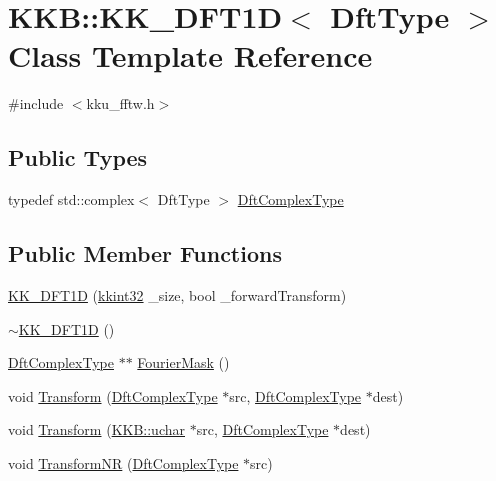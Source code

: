 \hypertarget{class_k_k_b_1_1_k_k___d_f_t1_d}{}\section{K\+KB\+:\+:K\+K\+\_\+\+D\+F\+T1D$<$ Dft\+Type $>$ Class Template Reference}
\label{class_k_k_b_1_1_k_k___d_f_t1_d}


{\ttfamily \#include $<$kku\+\_\+fftw.\+h$>$}

\subsection*{Public Types}
\begin{DoxyCompactItemize}
\item 
typedef std\+::complex$<$ Dft\+Type $>$ \hyperlink{class_k_k_b_1_1_k_k___d_f_t1_d_a4cbc827157dd30ddec2d3753e552a827}{Dft\+Complex\+Type}
\end{DoxyCompactItemize}
\subsection*{Public Member Functions}
\begin{DoxyCompactItemize}
\item 
\hyperlink{class_k_k_b_1_1_k_k___d_f_t1_d_ac65a8ecdf2e6ca0dcd032bcd0432993e}{K\+K\+\_\+\+D\+F\+T1D} (\hyperlink{namespace_k_k_b_a8fa4952cc84fda1de4bec1fbdd8d5b1b}{kkint32} \+\_\+size, bool \+\_\+forward\+Transform)
\item 
\hyperlink{class_k_k_b_1_1_k_k___d_f_t1_d_a30bc503da8f05cc35efebac47cb7b768}{$\sim$\+K\+K\+\_\+\+D\+F\+T1D} ()
\item 
\hyperlink{class_k_k_b_1_1_k_k___d_f_t1_d_a4cbc827157dd30ddec2d3753e552a827}{Dft\+Complex\+Type} $\ast$$\ast$ \hyperlink{class_k_k_b_1_1_k_k___d_f_t1_d_a15e9f465d09d12bdc83815b741d802ce}{Fourier\+Mask} ()
\item 
void \hyperlink{class_k_k_b_1_1_k_k___d_f_t1_d_a97bb58639bdc8f8bf1c11bda9bbd9d3d}{Transform} (\hyperlink{class_k_k_b_1_1_k_k___d_f_t1_d_a4cbc827157dd30ddec2d3753e552a827}{Dft\+Complex\+Type} $\ast$src, \hyperlink{class_k_k_b_1_1_k_k___d_f_t1_d_a4cbc827157dd30ddec2d3753e552a827}{Dft\+Complex\+Type} $\ast$dest)
\item 
void \hyperlink{class_k_k_b_1_1_k_k___d_f_t1_d_aea6d631eb5646ce70e3f2708783a6dfe}{Transform} (\hyperlink{namespace_k_k_b_ace9969169bf514f9ee6185186949cdf7}{K\+K\+B\+::uchar} $\ast$src, \hyperlink{class_k_k_b_1_1_k_k___d_f_t1_d_a4cbc827157dd30ddec2d3753e552a827}{Dft\+Complex\+Type} $\ast$dest)
\item 
void \hyperlink{class_k_k_b_1_1_k_k___d_f_t1_d_ad10fde3b306273040c39fc5b1c2bc018}{Transform\+NR} (\hyperlink{class_k_k_b_1_1_k_k___d_f_t1_d_a4cbc827157dd30ddec2d3753e552a827}{Dft\+Complex\+Type} $\ast$src)
\end{DoxyCompactItemize}



